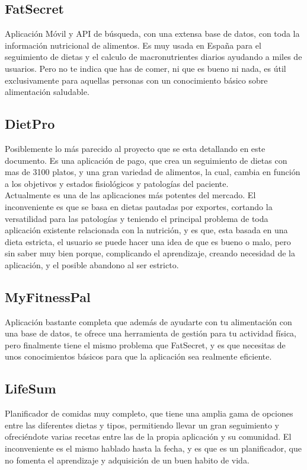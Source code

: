 \subsection{FatSecret}
Aplicación Móvil y API de búsqueda, con una extensa base de datos, con toda la información nutricional de alimentos. Es muy usada en España para el seguimiento de dietas y el calculo de macronutrientes diarios ayudando a miles de usuarios. Pero no te indica que has de comer, ni que es bueno ni nada, es útil exclusivamente para aquellas personas con un conocimiento básico sobre alimentación saludable. \\
\subsection{DietPro}
Posiblemente lo más parecido al proyecto que se esta detallando en este documento. Es una aplicación de pago, que crea un seguimiento de dietas con mas de 3100 platos, y una gran variedad de alimentos, la cual, cambia en función a los objetivos y estados fisiológicos y patologías del paciente.\\
Actualmente es una de las aplicaciones más potentes del mercado. El inconveniente es que se basa en dietas pautadas por exportes, cortando la versatilidad para las patologías y teniendo el principal problema de toda aplicación existente relacionada con la nutrición, y es que, esta basada en una dieta estricta, el usuario se puede hacer una idea de que es bueno o malo, pero sin saber muy bien porque, complicando el aprendizaje, creando necesidad de la aplicación, y el posible abandono al ser estricto.\\
\subsection{MyFitnessPal}
Aplicación bastante completa que además de ayudarte con tu alimentación con una base de datos, te ofrece una herramienta de gestión para tu actividad física, pero finalmente tiene el mismo problema que FatSecret, y es que necesitas de unos conocimientos básicos para que la aplicación sea realmente eficiente.\\
\subsection{LifeSum}
Planificador de comidas muy completo, que tiene una amplia gama de opciones entre las diferentes dietas y tipos, permitiendo llevar un gran seguimiento y ofreciéndote varias recetas entre las de la propia aplicación y su comunidad. El inconveniente es el mismo hablado hasta la fecha, y es que es un planificador, que no fomenta el aprendizaje y adquisición de un buen habito de vida. 
	
